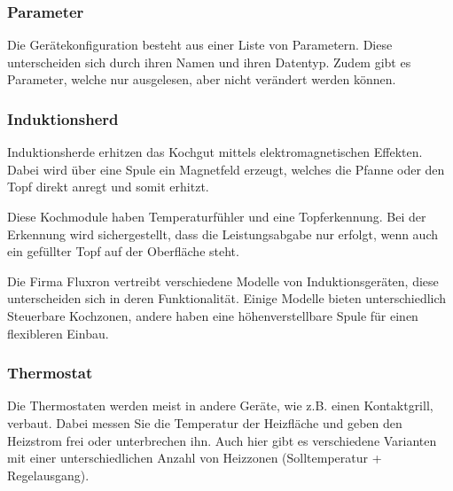\subsubsection{Parameter}
\label{subsubsec:Parameter}
Die Gerätekonfiguration besteht aus einer Liste von Parametern. Diese unterscheiden sich durch ihren Namen und ihren Datentyp. Zudem gibt es Parameter, welche nur ausgelesen, aber nicht verändert werden können.

\subsubsection{Induktionsherd}
\label{subsubsec:Induktionsherd}
Induktionsherde erhitzen das Kochgut mittels elektromagnetischen Effekten. Dabei wird über eine Spule ein Magnetfeld erzeugt, welches die Pfanne oder den Topf direkt anregt und somit erhitzt.

Diese Kochmodule haben Temperaturfühler und eine Topferkennung. Bei der Erkennung wird sichergestellt, dass die Leistungsabgabe nur erfolgt, wenn auch ein gefüllter Topf auf der Oberfläche steht.

Die Firma Fluxron vertreibt verschiedene Modelle von Induktionsgeräten, diese unterscheiden sich in deren Funktionalität. Einige Modelle bieten unterschiedlich Steuerbare Kochzonen, andere haben eine höhenverstellbare Spule für einen flexibleren Einbau.

\subsubsection{Thermostat}
\label{subsubsec:Thermostat}

Die Thermostaten werden meist in andere Geräte, wie z.B. einen Kontaktgrill, verbaut. Dabei messen Sie die Temperatur der Heizfläche und geben den Heizstrom frei oder unterbrechen ihn. Auch hier gibt es verschiedene Varianten mit einer unterschiedlichen Anzahl von Heizzonen (Solltemperatur + Regelausgang).
